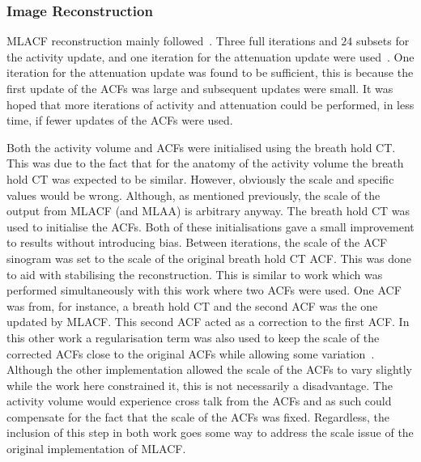             \subsubsection{Image Reconstruction} \label{sec:evaluation_of_pet_ct_motion_correction_incorporating_motion_models_using_mlacf_and_complex_gating_schemes_methods_image_reconstruction}
                \gls{MLACF} reconstruction mainly followed~. Three full iterations and $24$ subsets for the activity update, and one iteration for the attenuation update were used~\parencite{Nuyts2012ML-reconstructionFactors}. One iteration for the attenuation update was found to be sufficient, this is because the first update of the \glspl{ACF} was large and subsequent updates were small. It was hoped that more iterations of activity and attenuation could be performed, in less time, if fewer updates of the \glspl{ACF} were used.
                
                Both the activity volume and \glspl{ACF} were initialised using the breath hold \gls{CT}. This was due to the fact that for the anatomy of the activity volume the breath hold \gls{CT} was expected to be similar. However, obviously the scale and specific values would be wrong. Although, as mentioned previously, the scale of the output from \gls{MLACF} (and \gls{MLAA}) is arbitrary anyway. The breath hold \gls{CT} was used to initialise the \glspl{ACF}. Both of these initialisations gave a small improvement to results without introducing bias. Between iterations, the scale of the \gls{ACF} sinogram was set to the scale of the original breath hold \gls{CT} \gls{ACF}. This was done to aid with stabilising the reconstruction. This is similar to work which was performed simultaneously with this work where two \glspl{ACF} were used. One \gls{ACF} was from, for instance, a  breath hold \gls{CT} and the second \gls{ACF} was the one updated by \gls{MLACF}. This second \gls{ACF} acted as a correction to the first \gls{ACF}. In this other work a regularisation term was also used to keep the scale of the corrected \glspl{ACF} close to the original \glspl{ACF} while allowing some variation~\parencite{Jolivet2022JointPET}. Although the other implementation allowed the scale of the \glspl{ACF} to vary slightly while the work here constrained it, this is not necessarily a disadvantage. The activity volume would experience cross talk from the \glspl{ACF} and as such could compensate for the fact that the scale of the \glspl{ACF} was fixed. Regardless, the inclusion of this step in both work goes some way to address the scale issue of the original implementation of \gls{MLACF}.
                
